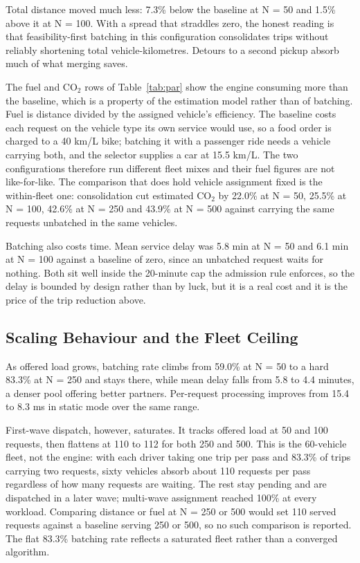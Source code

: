 \documentclass[conference]{IEEEtran}
\begin{document}
Total distance moved much less: 7.3\% below the baseline at N = 50 and 1.5\% above it at N = 100. With a spread that straddles zero, the honest reading is that feasibility-first batching in this configuration consolidates trips without reliably shortening total vehicle-kilometres. Detours to a second pickup absorb much of what merging saves.

The fuel and CO$_2$ rows of Table~\ref{tab:par} show the engine consuming more than the baseline, which is a property of the estimation model rather than of batching. Fuel is distance divided by the assigned vehicle's efficiency. The baseline costs each request on the vehicle type its own service would use, so a food order is charged to a 40 km/L bike; batching it with a passenger ride needs a vehicle carrying both, and the selector supplies a car at 15.5 km/L. The two configurations therefore run different fleet mixes and their fuel figures are not like-for-like. The comparison that does hold vehicle assignment fixed is the within-fleet one: consolidation cut estimated CO$_2$ by 22.0\% at N = 50, 25.5\% at N = 100, 42.6\% at N = 250 and 43.9\% at N = 500 against carrying the same requests unbatched in the same vehicles.

Batching also costs time. Mean service delay was 5.8 min at N = 50 and 6.1 min at N = 100 against a baseline of zero, since an unbatched request waits for nothing. Both sit well inside the 20-minute cap the admission rule enforces, so the delay is bounded by design rather than by luck, but it is a real cost and it is the price of the trip reduction above.

\subsection{Scaling Behaviour and the Fleet Ceiling}
As offered load grows, batching rate climbs from 59.0\% at N = 50 to a hard 83.3\% at N = 250 and stays there, while mean delay falls from 5.8 to 4.4 minutes, a denser pool offering better partners. Per-request processing improves from 15.4 to 8.3 ms in static mode over the same range.

First-wave dispatch, however, saturates. It tracks offered load at 50 and 100 requests, then flattens at 110 to 112 for both 250 and 500. This is the 60-vehicle fleet, not the engine: with each driver taking one trip per pass and 83.3\% of trips carrying two requests, sixty vehicles absorb about 110 requests per pass regardless of how many requests are waiting. The rest stay pending and are dispatched in a later wave; multi-wave assignment reached 100\% at every workload. Comparing distance or fuel at N = 250 or 500 would set 110 served requests against a baseline serving 250 or 500, so no such comparison is reported. The flat 83.3\% batching rate reflects a saturated fleet rather than a converged algorithm.
\end{document}
